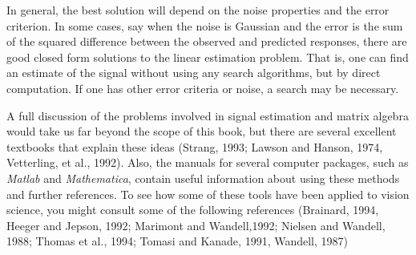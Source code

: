 In general, the best solution will depend on the noise properties and
the error criterion.  In some cases, say when the noise is Gaussian
and the error is the sum of the squared difference between the
observed and predicted responses, there are good closed form solutions
to the linear estimation problem.  That is, one can find an estimate
of the signal without using any search algorithms, but by direct
computation.  If one has other error criteria or noise, a search may
be necessary.

A full discussion of the problems involved in signal estimation and
matrix algebra would take us far beyond the scope of this book, but
there are several excellent textbooks that explain these ideas
(Strang, 1993; Lawson and Hanson, 1974, Vetterling, et al., 1992).
Also, the manuals for several computer packages, such as {\em Matlab}
and {\em Mathematica}, contain useful information about using these
methods and further references. To see how some of these tools have
been applied to vision science, you might consult some of the
following references (Brainard, 1994, Heeger and Jepson, 1992;
Marimont and Wandell,1992; Nielsen and Wandell, 1988; Thomas et al.,
1994; Tomasi and Kanade, 1991, Wandell, 1987)




